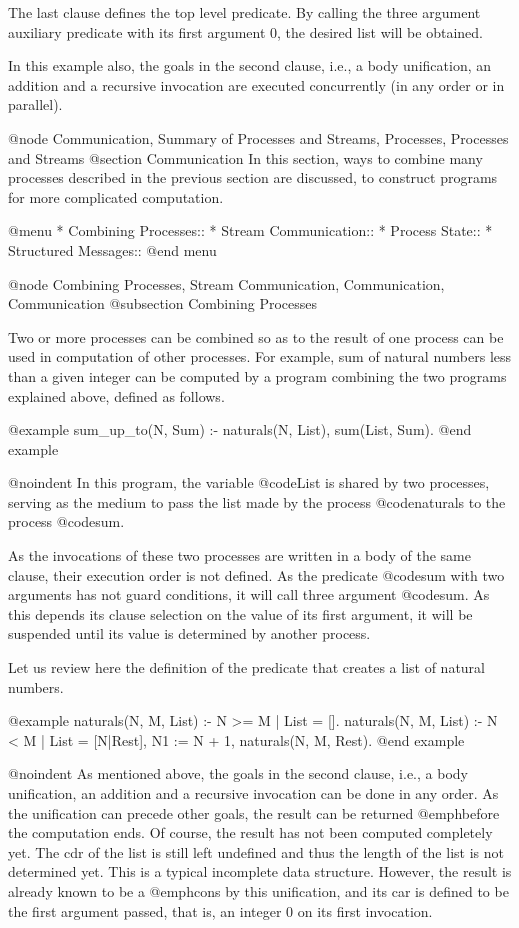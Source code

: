 {The last clause defines the top level predicate.  By calling the three
argument auxiliary predicate with its first argument 0, the desired
list will be obtained.

In this example also, the goals in the second clause, i.e., a body
unification, an addition and a recursive invocation are executed
concurrently (in any order or in parallel).

@node Communication, Summary of Processes and Streams, Processes, Processes and Streams
@section Communication
In this section, ways to combine many processes described in the
previous section are discussed, to construct programs for more
complicated computation.

@menu
* Combining Processes::         
* Stream Communication::        
* Process State::               
* Structured Messages::         
@end menu

@node Combining Processes, Stream Communication, Communication, Communication
@subsection Combining Processes

Two or more processes can be combined so as to the result of one process
can be used in computation of other processes.  For example, sum of
natural numbers less than a given integer can be computed by a program
combining the two programs explained above, defined as follows.

@example
sum_up_to(N, Sum) :- naturals(N, List), sum(List, Sum).
@end example

@noindent
In this program, the variable @code{List} is shared by two processes,
serving as the medium to pass the list made by the process
@code{naturals} to the process @code{sum}.

As the invocations of these two processes are written in a body of the
same clause, their execution order is not defined.  As the predicate
@code{sum} with two arguments has not guard conditions, it will call
three argument @code{sum}.  As this depends its clause selection on the
value of its first argument, it will be suspended until its value is
determined by another process.

Let us review here the definition of the predicate that creates a list
of natural numbers.

@example
naturals(N, M, List) :- N >= M | List = [].
naturals(N, M, List) :- N < M |
    List = [N|Rest],
    N1 := N + 1,
    naturals(N, M, Rest).
@end example

@noindent
As mentioned above, the goals in the second clause, i.e., a body
unification, an addition and a recursive invocation can be done in any
order.  As the unification can precede other goals, the result can be
returned @emph{before} the computation ends.  Of course, the result has
not been computed completely yet.  The cdr of the list is still left
undefined and thus the length of the list is not determined yet.  This
is a typical incomplete data structure.  However, the result is already
known to be a @emph{cons} by this unification, and its car is defined to
be the first argument passed, that is, an integer 0 on its first
invocation.

}
